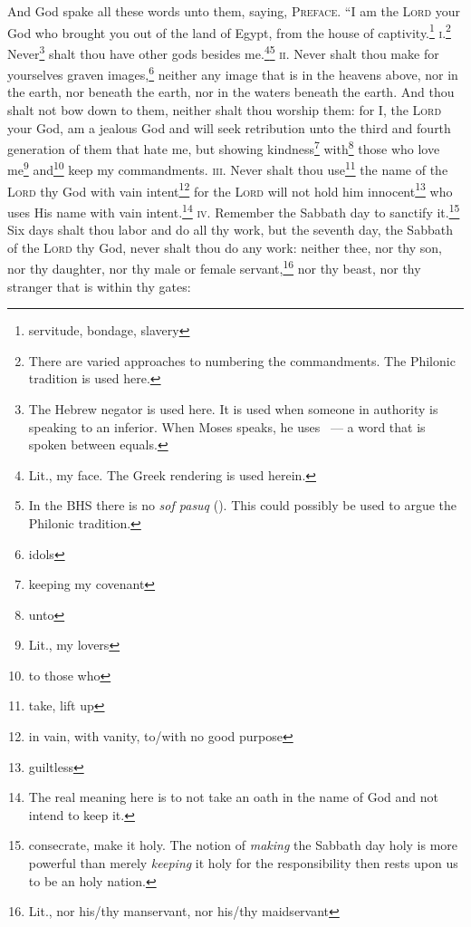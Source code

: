 

\begin{enumerate*}[mode=unboxed]
     And God spake all these words unto them, saying,%
     \textsc{Preface.} ``I am the \textsc{Lord} your God who brought you out of the land of Egypt, from the house of captivity.\footnote{servitude, bondage, slavery}%
     \textsc{i.}\footnote{There are varied approaches to numbering the commandments. The Philonic tradition is used here.} Never\footnote{The Hebrew negator  is used here. It is used when someone in authority is speaking to an inferior. When Moses speaks, he uses ~--- a word that is spoken between equals.} shalt thou have other gods besides me.\footnote{Lit., my face. The Greek rendering is used herein.}\footnote{In the BHS there is no \textit{sof pasuq} (). This could possibly be used to argue the Philonic tradition.}%
     \textsc{ii.} Never shalt thou make for yourselves graven images,\footnote{idols} neither any image that is in the heavens above, nor in the earth, nor beneath the earth, nor in the waters beneath the earth.%
     And thou shalt not bow down to them, neither shalt thou worship them: for I, the \textsc{Lord} your God, am a jealous God and will seek retribution unto the third and fourth generation of them that hate me,%
     but showing kindness\footnote{keeping my covenant} with\footnote{unto} those who love me\footnote{Lit., my lovers} and\footnote{to those who} keep my commandments.%
     \textsc{iii.} Never shalt thou use\footnote{take, lift up} the name of the \textsc{Lord} thy God with vain intent\footnote{in vain, with vanity, to/with no good purpose} for the \textsc{Lord} will not hold him innocent\footnote{guiltless} who uses His name with vain intent.\footnote{The real meaning here is to not take an oath in the name of God and not intend to keep it.}%
     \textsc{iv.} Remember the Sabbath day to sanctify it.\footnote{consecrate, make it holy. The notion of \emph{making} the Sabbath day holy is more powerful than merely \emph{keeping} it holy for the responsibility then rests upon us to be an holy nation.}%
     Six days shalt thou labor and do all thy work,%
     but the seventh day, the Sabbath of the \textsc{Lord} thy God, never shalt thou do any work: neither thee, nor thy son, nor thy daughter, nor thy male or female servant,\footnote{Lit., nor his/thy manservant, nor his/thy maidservant} nor thy beast, nor thy stranger that is within thy gates:%

\end{enumerate*}
